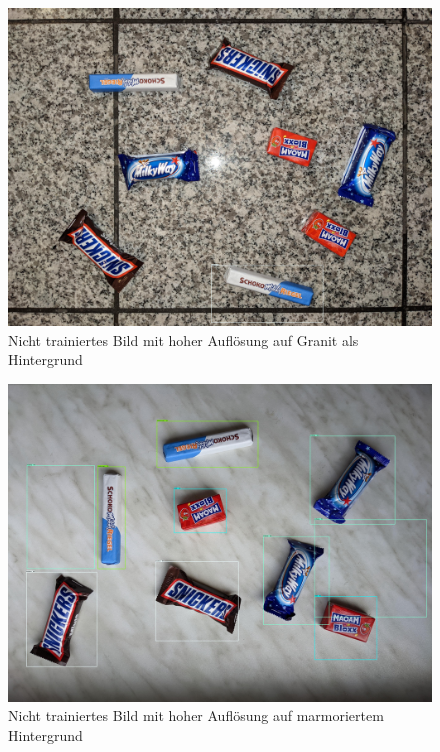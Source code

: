     \begin{figure}[H]
        \centering
        \includegraphics[angle = 90, width = \textwidth]{Bilder/models/model_comparison/ssd_mobilenet_v2_fpnlite_640x640_coco17_tpu-8/HD_on_granite.jpg}
        \caption{Nicht trainiertes Bild mit hoher Auflösung auf Granit als Hintergrund}
    \end{figure}
    
    \begin{figure}[H]
        \centering
        \includegraphics[angle = 90, width = \textwidth]{Bilder/models/model_comparison/ssd_mobilenet_v2_fpnlite_640x640_coco17_tpu-8/HD_on_marble.jpg}
        \caption{Nicht trainiertes Bild mit hoher Auflösung auf marmoriertem Hintergrund}
    \end{figure}
    
